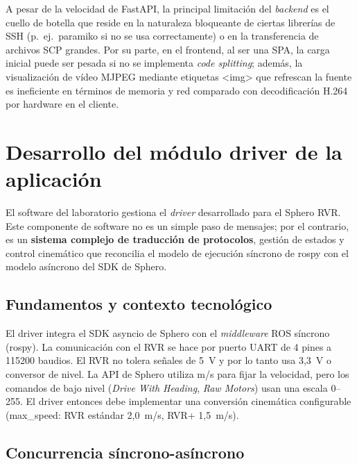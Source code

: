 \documentclass[12pt]{article}
\numberwithin{figure}{section}
\numberwithin{table}{section}
\def\code#1{#1}%
\newcommand{\code}[1]{\textcolor{codeblue}{\url{#1}}}
\begin{document}
A pesar de la velocidad de FastAPI, la principal limitación del \textit{backend} es el cuello de botella que reside en la naturaleza bloqueante de ciertas librerías de SSH (p.\ ej.\ paramiko si no se usa correctamente) o en la transferencia de archivos SCP grandes. Por su parte, en el frontend, al ser una SPA, la carga inicial puede ser pesada si no se implementa \emph{code splitting}; además, la visualización de vídeo MJPEG mediante etiquetas \code{<img>} que refrescan la fuente es ineficiente en términos de memoria y red comparado con decodificación H.264 por hardware en el cliente.


\section{Desarrollo del módulo driver de la aplicación}
\label{sec:driver_ros}

El software del laboratorio gestiona el \textit{driver} desarrollado para el Sphero RVR. Este componente de software no es un simple paso de mensajes; por el contrario, es un \textbf{sistema complejo de traducción de protocolos}, gestión de estados y control cinemático que reconcilia el modelo de ejecución síncrono de \code{rospy} con el modelo asíncrono del SDK de Sphero.


\subsection{Fundamentos y contexto tecnológico}

El driver integra el SDK asyncio de Sphero con el \textit{middleware} ROS síncrono (\code{rospy}). La comunicación con el RVR se hace por puerto UART de 4 pines a 115200 baudios. El RVR no tolera señales de 5~V y por lo tanto usa 3,3~V o conversor de nivel. La API de Sphero utiliza m/s para fijar la velocidad, pero los comandos de bajo nivel (\textit{Drive With Heading}, \textit{Raw Motors}) usan una escala 0--255. El driver entonces debe implementar una conversión cinemática configurable (\code{max\_speed}: RVR estándar 2,0~m/s, RVR+ 1,5~m/s).


\subsection{Concurrencia síncrono-asíncrono}
\end{document}
